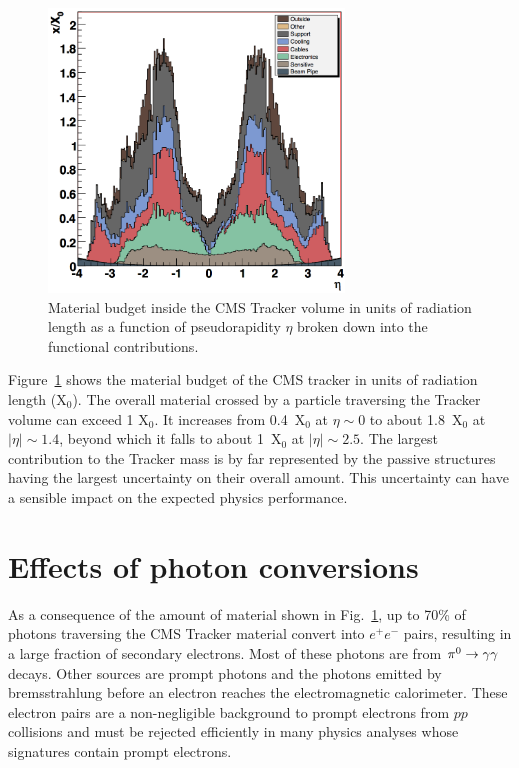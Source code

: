 \documentclass[a4paper]{jpconf}
\begin{document}
\begin{figure}[h!]
  \begin{center}
    \includegraphics[width=0.7\textwidth]{fig/trackerMaterialbudget.png}
    \caption{Material budget inside the CMS Tracker volume in units of radiation length as a function of pseudorapidity $\eta$ broken down into the functional contributions.}
    \label{fig:tkmaterial}
  \end{center}
\end{figure}



Figure~\ref{fig:tkmaterial} shows the material budget of the CMS tracker in units of radiation length (X$_0$). 
The overall material crossed by a particle traversing the Tracker volume can exceed 1 X$_0$. 
It increases from 0.4~X$_0$ at $\eta \sim 0$ to about 1.8~X$_0$ at $|\eta| \sim 1.4$, beyond which it falls to about 1~X$_0$ at $|\eta| \sim 2.5$.
The largest contribution to the Tracker mass is by far represented by the passive structures having the largest uncertainty on their overall amount. This uncertainty  can have a sensible impact on the expected physics performance. 



\section{Effects of  photon conversions}


As a consequence  of the amount of material shown in Fig.~\ref{fig:tkmaterial}, up to 70\% of photons traversing the CMS Tracker material convert into  $e^+ e^-$ pairs, resulting in a large fraction of secondary electrons. 
Most of these photons are from ${\rm \pi^0}  \to \gamma\gamma$ decays. Other sources are prompt photons and the photons emitted by bremsstrahlung before an electron reaches the electromagnetic calorimeter. 
These electron pairs are  a non-negligible background to prompt electrons from $pp$ collisions and must be rejected efficiently in many physics analyses whose signatures contain prompt electrons.
\end{document}
